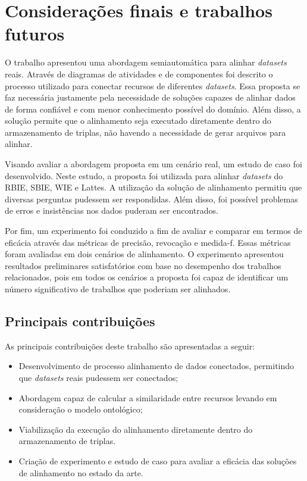 \chapter{Considerações finais e trabalhos futuros}
\label{cap:conclusao}
O trabalho apresentou uma abordagem semiautomática para alinhar \textit{datasets} reais. Através de diagramas de atividades e de componentes foi descrito o processo utilizado para conectar recursos de diferentes \textit{datasets}. Essa proposta se faz necessária justamente pela necessidade de soluções capazes de alinhar dados de forma confiável e com menor conhecimento possível do domínio. Além disso, a solução permite que o alinhamento seja executado diretamente dentro do armazenamento de triplas, não havendo a necessidade de gerar arquivos para alinhar. 

Visando avaliar a abordagem proposta em um cenário real, um estudo de caso foi desenvolvido. Neste estudo, a proposta foi utilizada para alinhar \textit{datasets} do RBIE, SBIE, WIE e Lattes. A utilização da solução de alinhamento permitiu que diversas perguntas pudessem ser respondidas. Além disso, foi possível problemas de erros e insistências nos dados puderam ser encontrados.

Por fim, um experimento foi conduzido  a fim de avaliar e comparar em termos de eficácia através das métricas de precisão, revocação e medida-f. Essas métricas foram avaliadas em dois cenários de alinhamento. O experimento apresentou resultados preliminares satisfatórios com base no desempenho dos trabalhos relacionados, pois em todos os cenários a proposta foi capaz de identificar um número significativo de trabalhos que poderiam ser alinhados. 

\section{Principais contribuições}
As principais contribuições deste trabalho são apresentadas a seguir:
\begin{itemize}
\item Desenvolvimento de processo alinhamento de dados conectados, permitindo que \textit{datasets} reais pudessem ser conectados;
\item Abordagem capaz de calcular a similaridade entre recursos levando em consideração o modelo ontológico;
\item Viabilização da execução do alinhamento diretamente dentro do armazenamento de triplas.
\item  Criação de experimento e estudo de caso para avaliar a eficácia das soluções de alinhamento no estado da arte.
\end{itemize}

